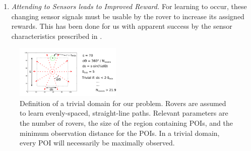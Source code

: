 \documentclass[letterpaper, 10 pt, conference]{ieeeconf}  %
\begin{document}
\begin{enumerate}
\item \emph{Attending to Sensors leads to Improved Reward.} For learning to occur, these changing sensor signals must be usable by the rover to increase its assigned rewards. This has been done for us with apparent success by the sensor characteristics prescribed in \cite{agogino2008analyzing}.


\end{enumerate}

\begin{figure}[h!]
    \centering
    \includegraphics[width=0.45\textwidth]{triviality.png}
    \caption{Definition of a trivial domain for our problem. Rovers are assumed to learn evenly-spaced, straight-line paths. Relevant parameters are the number of rovers, the size of the region containing POIs, and the minimum observation distance for the POIs. In a trivial domain, every POI will necessarily be maximally observed. }
    \label{fig:triviality}
\end{figure}
\end{document}
